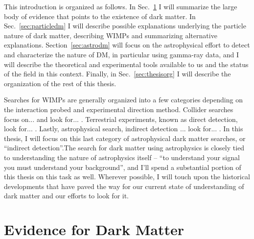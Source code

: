 This introduction is organized as follows. In Sec.~\ref{sec:evidence} I will summarize the large body of evidence that points to the existence of dark matter. In Sec.~\ref{sec:particledm} I will describe possible explanations underlying the particle nature of dark matter, describing WIMPs and summarizing alternative explanations. Section~\ref{sec:astrodm} will focus on the astrophysical effort to detect and characterize the nature of DM, in particular using gamma-ray data, and I will describe the theoretical and experimental tools available to us and the status of the field in this context. Finally, in Sec.~\ref{sec:thesisorg} I will describe the organization of the rest of this thesis.

Searches for WIMPs are generally organized into a few categories depending on the interaction probed and experimental direction method. Collider searches focus on... and look for... . Terrestrial experiments, known as direct detection, look for... . Lastly, astrophysical search, indirect detection ... look for... .  In this thesis, I will focus on this last category of astrophysical dark matter searches, or ``indirect detection''.The search for dark matter using astrophysics is closely tied to understanding the nature of astrophysics itself -- ``to understand your signal you must understand your background'', and I'll spend a substantial portion of this thesis on this task as well. Wherever possible, I will touch upon the historical developments that have paved the way for our current state of understanding of dark matter and our efforts to look for it.

\section{Evidence for Dark Matter}
\label{sec:evidence}



